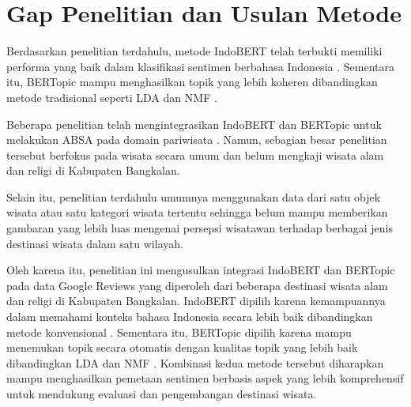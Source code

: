 \section{Gap Penelitian dan Usulan Metode}

Berdasarkan penelitian terdahulu, metode IndoBERT telah terbukti
memiliki performa yang baik dalam klasifikasi sentimen berbahasa
Indonesia \cite{yulianti2023,latifah2024,wafda2025}.
Sementara itu, BERTopic mampu menghasilkan topik yang lebih koheren
dibandingkan metode tradisional seperti LDA dan NMF
\cite{babalola2023,janssens2025}.

Beberapa penelitian telah mengintegrasikan IndoBERT dan BERTopic
untuk melakukan ABSA pada domain pariwisata
\cite{kurniawan2023,girsang2024,maylawati2024}.
Namun, sebagian besar penelitian tersebut berfokus pada wisata
secara umum dan belum mengkaji wisata alam dan religi di Kabupaten
Bangkalan.

Selain itu, penelitian terdahulu umumnya menggunakan data dari satu
objek wisata atau satu kategori wisata tertentu sehingga belum mampu
memberikan gambaran yang lebih luas mengenai persepsi wisatawan
terhadap berbagai jenis destinasi wisata dalam satu wilayah.

Oleh karena itu, penelitian ini mengusulkan integrasi IndoBERT dan
BERTopic pada data Google Reviews yang diperoleh dari beberapa
destinasi wisata alam dan religi di Kabupaten Bangkalan.
IndoBERT dipilih karena kemampuannya dalam memahami konteks bahasa
Indonesia secara lebih baik dibandingkan metode konvensional
\cite{yulianti2023,latifah2024}. Sementara itu, BERTopic dipilih
karena mampu menemukan topik secara otomatis dengan kualitas topik
yang lebih baik dibandingkan LDA dan NMF
\cite{babalola2023,janssens2025}. Kombinasi kedua metode tersebut
diharapkan mampu menghasilkan pemetaan sentimen berbasis aspek yang
lebih komprehensif untuk mendukung evaluasi dan pengembangan
destinasi wisata.